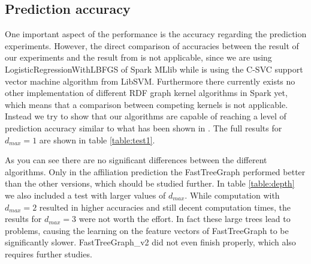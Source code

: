 \documentclass{easychair}
\begin{document}
\subsection{Prediction accuracy}
One important aspect of the performance is the accuracy regarding the prediction experiments. However, the direct comparison of accuracies between the result of our experiments and the result from \cite{FGK} is not applicable, since we are using LogisticRegressionWithLBFGS of Spark MLlib while \cite{FGK} is using the C-SVC support vector machine algorithm from LibSVM. Furthermore there currently exists no other implementation of different RDF graph kernel algorithms in Spark yet, which means that a comparison between competing kernels is not applicable. Instead we try to show that our algorithms are capable of reaching a level of prediction accuracy similar to what has been shown in \cite{FGK}. The full results for $d_{max}=1$ are shown in table \ref{table:test1}.

As you can see there are no significant differences between the different algorithms. Only in the affiliation prediction the FastTreeGraph performed better than the other versions, which should be studied further. In table \ref{table:depth} we also included a test with larger values of $d_{max}$. While computation with $d_{max}=2$ resulted in higher accuracies and still decent computation times, the results for $d_{max}=3$ were not worth the effort. In fact these large trees lead to problems, causing the learning on the feature vectors of FastTreeGraph to be significantly slower. FastTreeGraph\_v2 did not even finish properly, which also requires further studies.
\end{document}
